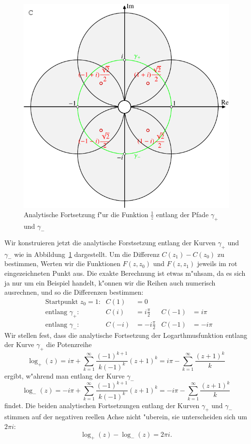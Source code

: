 \begin{beispiel}
\begin{figure}
\centering
\includegraphics{chapters/images/komplex-2.pdf}
\caption{Analytische Fortsetzung f"ur die Funktion $\frac1z$ 
entlang der Pfade $\gamma_+$ und $\gamma_-$
\label{komplex:logfortsetzung}}
\end{figure}
Wir konstruieren jetzt die analytische Forstsetzung entlang der Kurven
$\gamma_+$ und $\gamma_-$ wie in Abbildung~\ref{komplex:logfortsetzung}
dargestellt.
Um die Differenz $C(z_1)-C(z_0)$ zu bestimmen, Werten wir die Funktionen
$F(z,z_0)$ und $F(z,z_1)$ jeweils im rot eingezeichneten Punkt aus.
Die exakte Berechnung ist etwas m"uhsam, da es sich ja nur um ein Beispiel
handelt, k"onnen wir die Reihen auch numerisch ausrechnen, und so die
Differenzen bestimmen:
\begin{align*}
&\text{Startpunkt $z_0=1$:}& C(1)&=0             &       &       \\
&\text{entlang $\gamma_+$:}& C(i)&= i\frac{\pi}2 & C(-1) &=  i\pi\\
&\text{entlang $\gamma_-$:}&C(-i)&=-i\frac{\pi}2 & C(-1) &= -i\pi
\end{align*}
Wir stellen fest, dass die analytische Fortsetzung der Logarthmusfunktion
entlang der Kurve $\gamma_+$ die Potenzreihe
\[
\log_+(z)
=
i\pi +\sum_{k=1}^\infty \frac{(-1)^{k+1}}{k(-1)^k}(z+1)^k
=
i\pi
-
\sum_{k=1}^\infty \frac{(z+1)^k}{k}
\]
ergibt, w"ahrend man entlang der  Kurve $\gamma_-$
\[
\log_-(z)
=
-i\pi +\sum_{k=1}^\infty \frac{(-1)^{k+1}}{k(-1)^k}(z+1)^k
=
-i\pi
-
\sum_{k=1}^\infty \frac{(z+1)^k}{k}
\]
findet.
Die beiden analytischen Fortsetzungen entlang der Kurven $\gamma_+$ und
$\gamma_-$ stimmen auf der negativen reellen Achse nicht "uberein,
sie unterscheiden sich um $2\pi i$:
\[
\log_+(z)-\log_-(z)=2\pi i.
\]
\end{beispiel}

